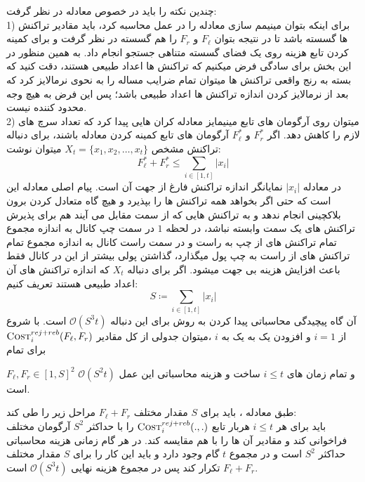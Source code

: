 چندین نکته را باید در خصوص معادله   در نظر گرفت:\\
1) برای اینکه بتوان مینیمم سازی معادله  را در عمل محاسبه کرد، باید مقادیر تراکنش ها گسسته باشد تا در نتیجه بتوان 
$F_{\ell}$
و
$F_r$
را هم گسسته در نظر گرفت و برای کمینه کردن تابع هزینه روی یک فضای گسسته متناهی جستجو انجام داد. به همین منظور در این بخش برای سادگی فرض میکنیم که تراکنش ها اعداد طبیعی هستند، دقت کنید که بسته به رنج واقعی تراکنش ها میتوان تمام ضرایب مساله را به نحوی نرمالایز کرد که بعد از نرمالایز کردن اندازه تراکنش ها اعداد طبیعی باشد؛ پس این فرض به هیچ وجه محدود کننده نیست.\\
2) میتوان روی آرگومان های تابع مینیمایز معادله   کران هایی پیدا کرد که تعداد سرچ های لازم را کاهش دهد. اگر 
$F_r^*$
و
$F_{\ell}^*$
آرگومان های تابع کمینه کردن معادله  باشند، برای دنباله تراکنش مشخص
$X_t=\{x_1,x_2,\dots,x_t\}$
میتوان نوشت:
\begin{equation}\label{eq:FlFr_bound}
F_{\ell}^* + F_r^* \leq \sum_{i \in [1,t]} |x_i| 
\end{equation}
در معادله  
$|x_i|$
نمایانگر اندازه تراکنش فارغ از جهت آن است. پیام اصلی معادله  این است که \off حتی اگر بخواهد همه تراکنش ها را بپذیرد و هیچ گاه متعادل کردن برون بلاکچینی انجام ندهد و به تراکنش هایی که از سمت مقابل می آیند هم برای پذیرش تراکنش های یک سمت وابسته نباشد، در لحظه $1$  در سمت چپ کانال به اندازه مجموع تمام تراکنش های از چپ به راست و در سمت راست کانال به اندازه مجموع تمام تراکنش های از راست به چپ پول میگذارد، گذاشتن پولی بیشتر از این در کانال فقط باعث افزایش هزینه بی جهت میشود.
اگر برای دنباله
$X_t$
که اندازه تراکنش های آن اعداد طبیعی هستند تعریف کنیم:
\begin{equation}
S \coloneq \sum_{i \in [1,t]} |x_i|
\end{equation}
آن گاه پیچیدگی محاسباتی پیدا کردن \off به روش  برای این دنباله
$\mathcal{O}(S^3t)$
است.
با شروع از 
$i =1$
و افزودن یک به یک به
$i$
،میتوان جدولی از کل مقادیر 
$\textsc{Cost}_{i}^{rej+reb}(F_{\ell},F_{r})$
برای تمام 

$F_{\ell},F_{r} \in [1,S]^2$
 و تمام زمان های
$i \leq t$
ساخت و هزینه محاسباتی این عمل
$\mathcal{O}(S^2t)$
است.

طبق معادله  ، \off باید برای $S$ مقدار مختلف 
$F_{\ell}+F_{r}$
مراحل زیر را طی کند:\\
\off باید 
برای هر
$i \leq t$
هربار تابع
$\textsc{Cost}_{i}^{rej+reb}(.,.)$
را با حداکثر
$S^2$
آرگومان مختلف فراخوانی کند و مقادیر آن ها را با هم مقایسه کند. در هر گام زمانی هزینه محاسباتی \off حداکثر 
$S^2$
است و در مجموع 
$t$
گام وجود دارد و \off باید این کار را برای 
$S$ مقدار مختلف 
$F_{\ell}+F_{r}$
تکرار کند پس در مجموع هزینه نهایی \off
$\mathcal{O}(S^3t)$
است. 

